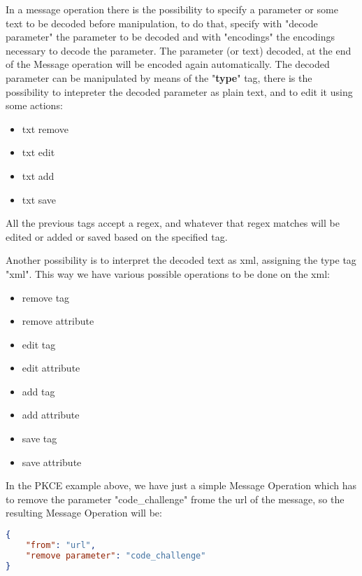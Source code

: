 In a message operation there is the possibility to specify a parameter or some text to be decoded before manipulation, to do that, specify with "decode parameter" the parameter to be decoded and with "encodings" the encodings necessary to decode the parameter. The parameter (or text) decoded, at the end of the Message operation will be encoded again automatically.
The decoded parameter can be manipulated by means of the "\textbf{type}" tag, there is the possibility to intepreter the decoded parameter as plain text, and to edit it using some actions:
\begin{itemize}
    \item txt remove
    \item txt edit
    \item txt add
    \item txt save
\end{itemize}
All the previous tags accept a regex, and whatever that regex matches will be edited or added or saved based on the specified tag.

Another possibility is to interpret the decoded text as xml, assigning the type tag "xml".
This way we have various possible operations to be done on the xml:
\begin{itemize}
    \item remove tag
    \item remove attribute
    \item edit tag
    \item edit attribute
    \item add tag
    \item add attribute 
    \item save tag
    \item save attribute
\end{itemize}

In the PKCE example above, we have just a simple Message Operation which has to remove the parameter "code\_challenge" frome the url of the message, so the resulting Message Operation will be:
\begin{lstlisting}[language=json]
{
    "from": "url",
    "remove parameter": "code_challenge"
}
\end{lstlisting}

